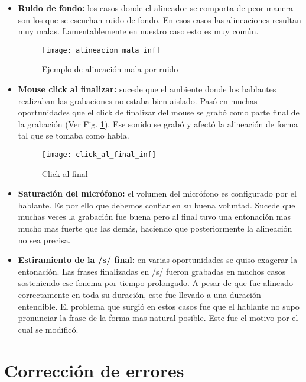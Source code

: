 \begin{itemize}
    \item \textbf{Ruido de fondo:} los casos donde el alineador se comporta de peor manera son los que se escuchan ruido de fondo. En esos casos las alineaciones resultan muy malas. Lamentablemente en nuestro caso esto es muy común. 

\begin{figure}[h!]
    \centerline{\texttt{[image: alineacion\_mala\_inf]} }
    \caption{Ejemplo de alineación mala por ruido}
\end{figure}

    \item \textbf{Mouse click al finalizar:} sucede que el ambiente donde los hablantes realizaban las grabaciones no estaba bien aislado. Pasó en muchas oportunidades que el click de finalizar del mouse se grabó como parte final de la grabación (Ver Fig. \ref{clickFinal}). Ese sonido se grabó y afectó la alineación de forma tal que se tomaba como habla.
    
\begin{figure}[h!]
    \centerline{\texttt{[image: click\_al\_final\_inf]} }
    \caption{Click al final}
    \label{clickFinal}
\end{figure}

    \item \textbf{Saturación del micrófono:} el volumen del micrófono es configurado por el hablante. Es por ello que debemos confiar en su buena voluntad. Sucede que muchas veces la grabación fue buena pero al final tuvo una entonación mas mucho mas fuerte que las demás, haciendo que posteriormente la alineación no sea precisa.

    \item \textbf{Estiramiento de la /s/ final:} en varias oportunidades se quiso exagerar la entonación. Las frases finalizadas en /s/ fueron grabadas en muchos casos sosteniendo ese fonema por tiempo prolongado. A pesar de que fue alineado correctamente en toda su duración, este fue llevado a una duración entendible. El problema que surgió en estos casos fue que el hablante no supo pronunciar la frase de la forma mas natural posible. Este fue el motivo por el cual se modificó.
\end{itemize}

\section{Corrección de errores}

